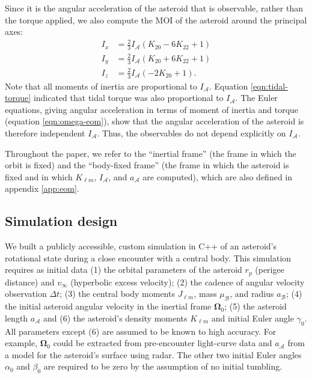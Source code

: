 \documentclass[fleqn,usenatbib]{mnras}
\newcommand{\parens}[1]{\left( #1 \right)}
\begin{document}
Since it is the angular acceleration of the asteroid that is observable, rather than the torque applied, we also compute the MOI of the asteroid around the principal axes: 
\begin{equation}
  \begin{split}
    I_x &= \frac{2}{3} I_\mathcal{A} \parens{K_{20} - 6 K_{22} + 1}\\
    I_y &= \frac{2}{3} I_\mathcal{A} \parens{K_{20} + 6 K_{22} + 1}\\
    I_z &= \frac{2}{3} I_\mathcal{A} \parens{-2K_{20} + 1}.
  \end{split}
  \label{eqn:moi}
\end{equation}
Note that all moments of inertia are proportional to $I_\mathcal{A}$. Equation \ref{eqn:tidal-torque} indicated that tidal torque was also proportional to $I_\mathcal{A}$. The Euler equations, giving angular acceleration in terms of moment of inertia and torque (equation \ref{eqn:omega-eom}), show that the angular acceleration of the asteroid is therefore independent $I_\mathcal{A}$. Thus, the observables do not depend explicitly on $I_\mathcal{A}$.

Throughout the paper, we refer to the ``inertial frame'' (the frame in which the orbit is fixed) and the ``body-fixed frame'' (the frame in which the asteroid is fixed and in which $K_{\ell m}$, $I_\mathcal{A}$, and $a_\mathcal{A}$ are computed), which are also defined in appendix \ref{app:eom}.

\subsection{Simulation design}
\label{sec:sim}

We built a publicly accessible, custom simulation in C++ of an asteroid's rotational state during a close encounter with a central body. This simulation requires as initial data (1) the orbital parameters of the asteroid $r_p$ (perigee distance) and $v_\infty$ (hyperbolic excess velocity); (2) the cadence of angular velocity observation $\Delta t$; (3) the central body moments $J_{\ell m}$, mass $\mu_\mathcal{B}$, and radius $a_\mathcal{B}$; (4) the initial asteroid angular velocity in the inertial frame $\bm \Omega_0$; (5) the asteroid length $a_\mathcal{A}$ and (6) the asteroid's density moments $K_{\ell m}$ and initial Euler angle $\gamma_0$. All parameters except (6) are assumed to be known to high accuracy. For example, $\bm \Omega_0$ could be extracted from pre-encounter light-curve data and $a_\mathcal{A}$ from a model for the asteroid's surface using radar. The other two initial Euler angles $\alpha_0$ and $\beta_0$ are required to be zero by the assumption of no initial tumbling.
\end{document}
